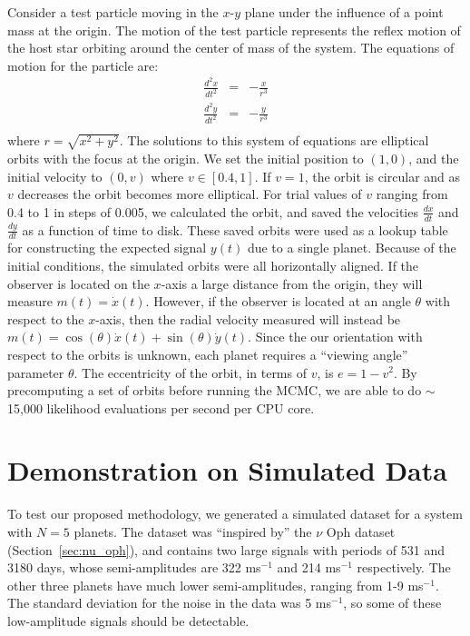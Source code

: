 \documentclass[useAMS,usenatbib]{mn2e}
\begin{document}
Consider a test particle moving in the $x$-$y$ plane under the influence of a
point mass at the origin. The motion of the test particle represents the
reflex motion of the host star orbiting around the center of mass of the
system. The equations of motion for the particle are:
\begin{eqnarray}
\frac{d^2x}{dt^2} &=& -\frac{x}{r^3} \\
\frac{d^2y}{dt^2} &=& -\frac{y}{r^3} \\
\end{eqnarray}
where $r = \sqrt{x^2 + y^2}$. The solutions to this system of equations are elliptical orbits
with the focus at the origin. We set the initial position to $(1, 0)$, and
the initial velocity to $(0, v)$ where $v \in [0.4, 1]$.
If $v=1$, the orbit is circular and as $v$ decreases the orbit becomes more
elliptical. For trial values of $v$ ranging from 0.4 to 1 in steps of 0.005,
we calculated the orbit, and saved the
velocities $\frac{dx}{dt}$ and $\frac{dy}{dt}$ as a function of time to disk.
These saved orbits were used as a lookup table for constructing the expected
signal $y(t)$ due to a single planet.
Because of the initial conditions, the simulated orbits were all horizontally
aligned. If the observer is located on the $x$-axis a large distance
from the origin, they will measure $m(t) = \dot{x}(t)$. However, if the
observer is located at an angle $\theta$ with respect to the $x$-axis, then
the radial velocity measured will instead be
$m(t) = \cos(\theta)\dot{x}(t) + \sin(\theta)\dot{y}(t)$.
Since the our orientation with respect to the orbits is unknown, each planet
requires a ``viewing angle'' parameter $\theta$.
The eccentricity of the orbit, in terms of $v$, is $e = 1 - v^2$.
By precomputing a set of orbits before running the MCMC, we are able to
do $\sim$ 15,000 likelihood evaluations per second per CPU core.

\section{Demonstration on Simulated Data}
To test our proposed methodology, we generated a simulated dataset for a
system with $N=5$ planets. The dataset was ``inspired by'' the $\nu$ Oph
dataset (Section~\ref{sec:nu_oph}), and contains two large signals with
periods of 531 and 3180 days, whose semi-amplitudes are
322 ms$^{-1}$ and 214 ms$^{-1}$ respectively. The other three planets have
much lower semi-amplitudes, ranging from 1-9 ms$^{-1}$. The standard deviation
for the noise in the data was 5 ms$^{-1}$, so some of these low-amplitude
signals should be detectable.
\end{document}

